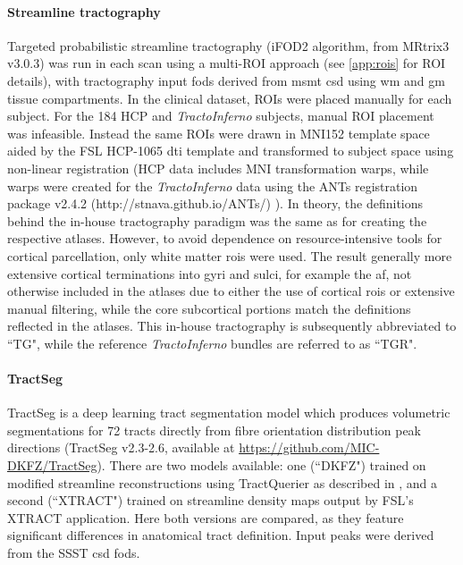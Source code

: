 \paragraph*{Streamline tractography}

Targeted probabilistic streamline tractography (iFOD2 algorithm\autocite{Tournier2010}, from MRtrix3\autocite{Tournier2019} v3.0.3)  was run in each scan using a multi-ROI approach (see \ref{app:rois} for ROI details), with tractography input \glspl{fod} derived from \gls{msmt} \gls{csd} \autocite{Jeurissen2014} using \gls{wm} and \gls{gm} tissue compartments.
In the clinical dataset, ROIs were placed manually for each subject.
For the 184 HCP and \textit{TractoInferno} subjects, manual ROI placement was infeasible.
Instead the same ROIs were drawn in MNI152 template space aided by the FSL HCP-1065 \gls{dti} template\autocite{FSLATLAS} and transformed to subject space using non-linear registration
(HCP data includes MNI transformation warps, while warps were created for the \textit{TractoInferno} data using the ANTs registration package v2.4.2 (http://stnava.github.io/ANTs/) \autocite{Tustison2013,Avants2011}).
In theory, the definitions behind the in-house tractography paradigm was the same as for creating the respective atlases.
However, to avoid dependence on resource-intensive tools for cortical parcellation, only white matter \glspl{roi} were used.
The result generally more extensive cortical terminations into gyri and sulci, for example the \gls{af}, not otherwise included in the atlases due to either the use of cortical \glspl{roi} or extensive manual filtering, while the core subcortical portions match the definitions reflected in the atlases.
This in-house tractography is subsequently abbreviated to ``TG", while the reference \textit{TractoInferno} bundles are referred to as ``TGR".

\paragraph*{TractSeg}

TractSeg \autocite{Wasserthal2018} is a deep learning tract segmentation model which produces volumetric segmentations for 72 tracts directly from fibre orientation distribution peak directions (TractSeg v2.3-2.6, available at \url{https://github.com/MIC-DKFZ/TractSeg}).
There are two models available: one (``DKFZ") trained on modified streamline reconstructions using TractQuerier \autocite{Wassermann2016} as described in \textcite{Wasserthal2018}, and a second (``XTRACT") trained on streamline density maps output by FSL's XTRACT application. \autocite{Warrington2020}
Here both versions are compared, as they feature significant differences in anatomical tract definition.
Input peaks were derived from the SSST \gls{csd} \glspl{fod}.

